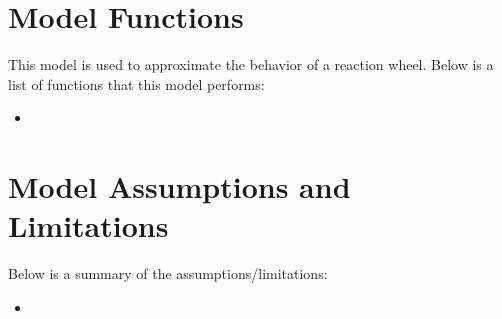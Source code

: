 \section{Model Functions}

This model is used to approximate the behavior of a reaction wheel. Below is a list of functions that this model performs:

\begin{itemize}
	\item 
\end{itemize}

\section{Model Assumptions and Limitations}
Below is a summary of the assumptions/limitations:

\begin{itemize}
	\item 
\end{itemize}